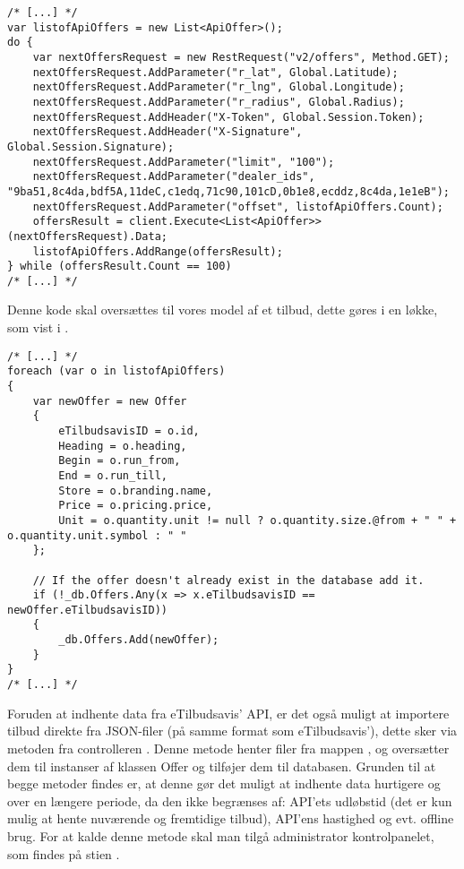 \begin{lstlisting}[caption=C\#-kode som anvender ``/v2/offers'' delen af API'et til at hente tilbud., label=apiofferscs]
/* [...] */
var listofApiOffers = new List<ApiOffer>();
do {
    var nextOffersRequest = new RestRequest("v2/offers", Method.GET);
    nextOffersRequest.AddParameter("r_lat", Global.Latitude);
    nextOffersRequest.AddParameter("r_lng", Global.Longitude);
    nextOffersRequest.AddParameter("r_radius", Global.Radius);
    nextOffersRequest.AddHeader("X-Token", Global.Session.Token);
    nextOffersRequest.AddHeader("X-Signature", Global.Session.Signature);
    nextOffersRequest.AddParameter("limit", "100");
    nextOffersRequest.AddParameter("dealer_ids", "9ba51,8c4da,bdf5A,11deC,c1edq,71c90,101cD,0b1e8,ecddz,8c4da,1e1eB");
    nextOffersRequest.AddParameter("offset", listofApiOffers.Count);
    offersResult = client.Execute<List<ApiOffer>>(nextOffersRequest).Data;
    listofApiOffers.AddRange(offersResult);
} while (offersResult.Count == 100)
/* [...] */
\end{lstlisting}

Denne kode skal oversættes til vores model af et tilbud, dette gøres i en  løkke, som vist i .

\begin{lstlisting}[caption={C\#-kode som bruger API-data til at oprette instanser af Offer-klassen, og tilføjer dem til databasen}, label=apiofferstooffercs]
/* [...] */
foreach (var o in listofApiOffers)
{
    var newOffer = new Offer
    {
        eTilbudsavisID = o.id,
        Heading = o.heading,
        Begin = o.run_from,
        End = o.run_till,
        Store = o.branding.name,
        Price = o.pricing.price,
        Unit = o.quantity.unit != null ? o.quantity.size.@from + " " + o.quantity.unit.symbol : " "
    };

    // If the offer doesn't already exist in the database add it.
    if (!_db.Offers.Any(x => x.eTilbudsavisID == newOffer.eTilbudsavisID))
    {
        _db.Offers.Add(newOffer);
    }
}
/* [...] */
\end{lstlisting}

Foruden at indhente data fra eTilbudsavis' API, er det også muligt at importere tilbud direkte fra JSON-filer (på samme format som eTilbudsavis'), dette sker via metoden  fra controlleren . 
Denne metode henter filer fra mappen , og oversætter dem til instanser af klassen Offer og tilføjer dem til databasen. 
Grunden til at begge metoder findes er, at denne gør det muligt at indhente data hurtigere og over en længere periode, da den ikke begrænses af: API'ets udløbstid (det er kun mulig at hente nuværende og fremtidige tilbud), API'ens hastighed og evt. offline brug. 
For at kalde denne metode skal man tilgå administrator kontrolpanelet, som findes på stien .

